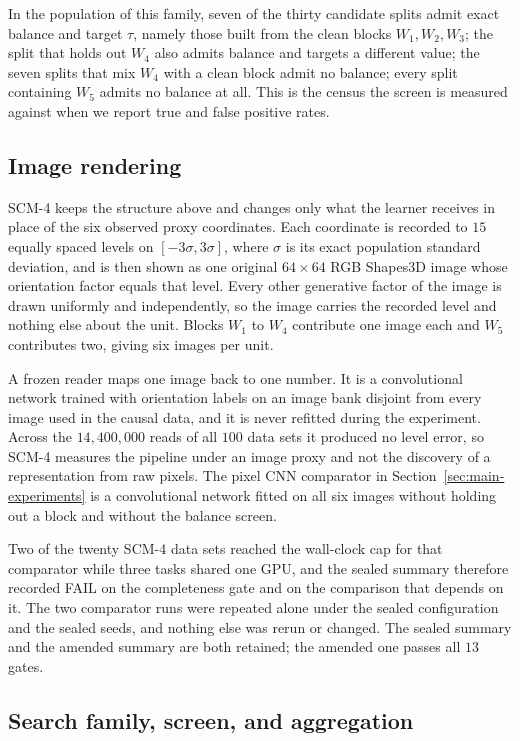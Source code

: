 In the population of this family, seven of the thirty candidate splits admit exact balance and target $\tau$, namely those built from the clean blocks $W_1,W_2,W_3$; the split that holds out $W_4$ also admits balance and targets a different value; the seven splits that mix $W_4$ with a clean block admit no balance; every split containing $W_5$ admits no balance at all. This is the census the screen is measured against when we report true and false positive rates.

\subsection{Image rendering}

SCM-4 keeps the structure above and changes only what the learner receives in place of the six observed proxy coordinates. Each coordinate is recorded to $15$ equally spaced levels on $[-3\sigma,3\sigma]$, where $\sigma$ is its exact population standard deviation, and is then shown as one original $64\times64$ RGB Shapes3D image whose orientation factor equals that level. Every other generative factor of the image is drawn uniformly and independently, so the image carries the recorded level and nothing else about the unit. Blocks $W_1$ to $W_4$ contribute one image each and $W_5$ contributes two, giving six images per unit.

A frozen reader maps one image back to one number. It is a convolutional network trained with orientation labels on an image bank disjoint from every image used in the causal data, and it is never refitted during the experiment. Across the $14{,}400{,}000$ reads of all $100$ data sets it produced no level error, so SCM-4 measures the pipeline under an image proxy and not the discovery of a representation from raw pixels. The pixel CNN comparator in Section~\ref{sec:main-experiments} is a convolutional network fitted on all six images without holding out a block and without the balance screen.

Two of the twenty SCM-4 data sets reached the wall-clock cap for that comparator while three tasks shared one GPU, and the sealed summary therefore recorded FAIL on the completeness gate and on the comparison that depends on it. The two comparator runs were repeated alone under the sealed configuration and the sealed seeds, and nothing else was rerun or changed. The sealed summary and the amended summary are both retained; the amended one passes all $13$ gates.

\subsection{Search family, screen, and aggregation}

